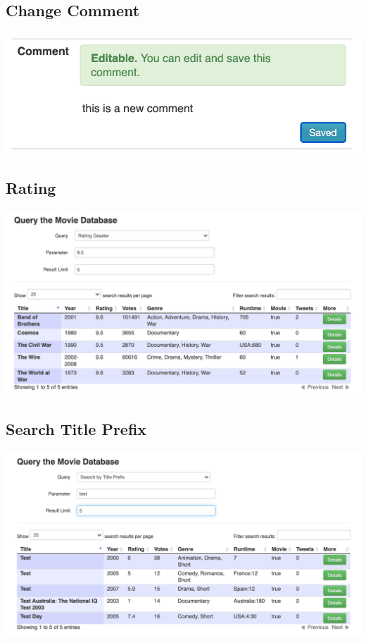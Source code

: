 \documentclass[ngerman]{dis-template-add}
\begin{document}
\subsection*{Change Comment}
\includegraphics[scale=0.3]{3-change_comment.png}

\subsection*{Rating}
\includegraphics[scale=0.3]{4-rating.png}

\subsection*{Search Title Prefix}
\includegraphics[scale=0.3]{5-title_prefix.png}
\end{document}
